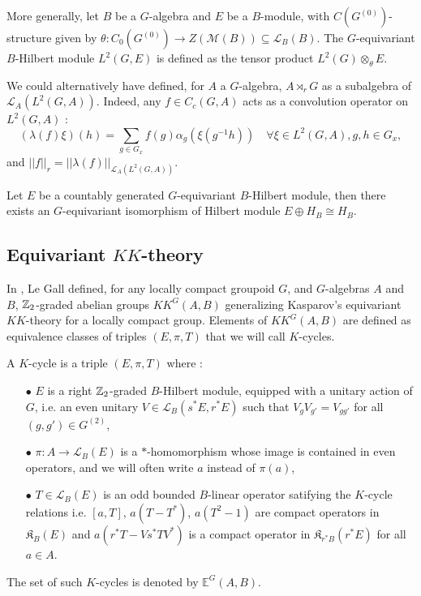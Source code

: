 \begin{Expl} More generally, let $B$ be a $G$-algebra and $E$ be a $B$-module, with $C(G^{(0)})$-structure given by $\theta : C_0(G^{(0)})\rightarrow Z(\mathcal M(B))\subseteq \mathcal L_B(B)$. The $G$-equivariant $B$-Hilbert module $L^2(G,E)$ is defined as the tensor product $ L^2(G)\otimes_\theta E$.
\end{Expl}

\begin{rk}
We could alternatively have defined, for $A$ a $G$-algebra, $A\rtimes_r G$ as a subalgebra of $\mathcal L_A(L^2(G,A))$. Indeed, any $f\in C_c(G,A)$ acts as a convolution operator on $L^2(G,A)$ :
\[(\lambda(f)\xi)(h) = \sum_{g\in G_x} f(g)\alpha_g(\xi(g^{-1} h))\quad \forall \xi\in L^2(G,A),g,h\in G_x,\]
and $||f||_{r} = ||\lambda(f)||_{\mathcal L_A (L^2(G,A))}$.
\end{rk}

\begin{lem} \label{GStabilization} Let $E$ be a countably generated $G$-equivariant $B$-Hilbert module, then there exists an $G$-equivariant isomorphism of Hilbert module $E \oplus H_B \cong H_B$.
\end{lem}

\subsection{Equivariant $KK$-theory}

In \cite{LeGall}, Le Gall defined, for any locally compact groupoid $G$, and $G$-algebras $A$ and $B$, $\mathbb Z_2$-graded abelian groups $KK^G(A,B)$ generalizing Kasparov's equivariant $KK$-theory for a locally compact group. Elements of $KK^G(A,B)$ are defined as equivalence classes of triples $(E,\pi,T)$ that we will call $K$-cycles.

\begin{definition} A $K$-cycle is a triple $(E,\pi,T)$ where :
\begin{itemize}
\item[$\bullet$] $E$ is a right $\mathbb Z_2$-graded $B$-Hilbert module, equipped with a unitary action of $G$, i.e. an even unitary $V\in\mathcal L_B(s^*E,r^*E)$ such that $V_g V_{g'} = V_{gg'}$ for all $(g,g')\in G^{(2)}$,
\item[$\bullet$] $\pi : A\rightarrow \mathcal L_B(E)$ is a $*$-homomorphism whose image is contained in even operators, and we will often write $a$ instead of $\pi(a)$,
\item[$\bullet$] $T\in\mathcal L_B(E)$ is an odd bounded $B$-linear operator satifying the $K$-cycle relations i.e. $[a, T]$, $a(T-T^*)$, $a(T^2-1)$ are compact operators in $\mathfrak K_B(E)$ and $a(r^* T -V s^*T V^*)$ is a compact operator in $\mathfrak K_{r^* B}(r^* E)$ for all $a\in A$.
\end{itemize} 
The set of such $K$-cycles is denoted by $\mathbb E^G(A,B)$.
\end{definition}

